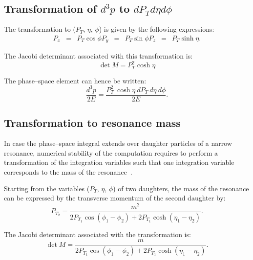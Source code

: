 \subsection{Transformation of $d^{3}p$ to $dP_{T} d\eta d\phi$}

The transformation to ($P_T$, $\eta$, $\phi$) is given by the following expressions:
\begin{eqnarray*}
P_{x} & = & P_{T} \cos \phi
P_{y} & = & P_{T} \sin \phi
P_{z} & = & P_{T} \sinh \eta.
\end{eqnarray*}

The Jacobi determinant associated with this transformation is:
\begin{equation*}
\det M = P_{T}^2 \cosh \eta
\end{equation*}

The phase--space element can hence be written:
\begin{equation*}
\frac{d^3p}{2 E} = \frac{{P_{T}^2 \ \cosh\eta \ dP_{T} \ d\eta \ d\phi}}{2 E}.
\end{equation*}

\subsection{Transformation to resonance mass}

In case the phase--space integral extends over daughter particles of a narrow resonance,
numerical stability of the computation requires to perform a transformation of the integration variables
such that one integration variable corresponds to the mass of the resonance~\cite{Artoisenet:2010cn}.

Starting from the variables ($P_T$, $\eta$, $\phi$) of two daughters, the mass of the resonance can be expressed by the transverse momentum of the second daughter by:
\begin{equation*}
P_{T_{2}} = \frac{m^2}{2 P_{T_{1}} \cos(\phi_{1} - \phi_{2}) + 2 P_{T_{1}} \cosh(\eta_{1} - \eta_{2})}.
\end{equation*}

The Jacobi determinant associated with the transformation is:
\begin{equation*}
\det M = \frac{m}{2 P_{T_{1}} \cos(\phi_{1} - \phi_{2}) + 2 P_{T_{1}} \cosh(\eta_{1} - \eta_{2})}.
\end{equation*}



